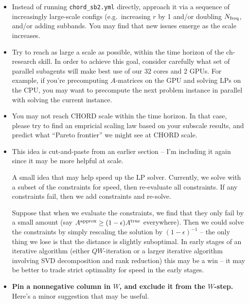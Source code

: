 \documentclass{article}
\numberwithin{equation}{section}   %
\begin{document}
\begin{itemize}

\item Instead of running \verb|chord_sb2.yml| directly, approach it via a sequence of
 increasingly large-scale configs (e.g.\ increasing $r$ by 1 and/or doubling $N_{\rm freq}$,
 and/or adding subbands. You may find that new issues emerge as the scale increases.

\item Try to reach as large a scale as possible, within the time horizon of the ch-research
 skill. In order to achieve this goal, consider carefully what set of parallel subagents will
 make best use of our 32 cores and 2 GPUs. For example, if you're precomputing $A$-matrices
 on the GPU and solving LPs on the CPU, you may want to precompute the next problem instance
 in parallel with solving the current instance.

\item You may not reach CHORD scale within the time horizon. In that case, please try to
 find an empricial scaling law based on your subscale results, and predict what ``Pareto
 frontier'' we might see at CHORD scale.

\item This idea is cut-and-paste from an earlier section -- I'm including it again since
 it may be more helpful at scale.

 A small idea that may help speed up the LP solver.
 Currently, we solve with a subset of the constraints for speed, then re-evaluate
 all constraints. If any constraints fail, then we add constraints and re-solve.

 Suppose that when we evaluate the constraints, we find that they only fail by
 a small amount (say $A^{\rm approx} \ge (1-\epsilon) A^{\rm true}$ everywhere).
 Then we could solve the constraints by simply rescaling the solution by $(1-\epsilon)^{-1}$ --
 the only thing we lose is that the distance is slightly suboptimal.
 In early stages of an iterative algorithm (either $QW$-iteration or a larger iterative
 algorithm involving SVD decomposition and rank reduction) this may be a win -- it may
 be better to trade strict optimality for speed in the early stages.

\item {\bf Pin a nonnegative column in $W$, and exclude it from the $W$-step.}
 Here's a minor suggestion that may be useful.


\end{itemize}
\end{document}
